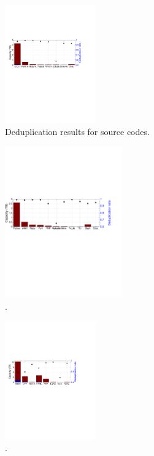 
\begin{figure}
	\centering
	\includegraphics[width=0.35\textwidth]{graphs/dedup-sc}
	\caption{Deduplication results for source codes.
	}
	\label{fig:dedup-sc}
\end{figure}

\begin{figure}
	\centering
	\includegraphics[width=0.45\textwidth]{graphs/dedup-scrp}
	\caption{.
	}
	\label{fig:dedup-scrp}
\end{figure}

\begin{figure}
	\centering
	\includegraphics[width=0.35\textwidth]{graphs/dedup-doc}
	\caption{.
	}
	\label{fig:dedup-doc}
\end{figure}

